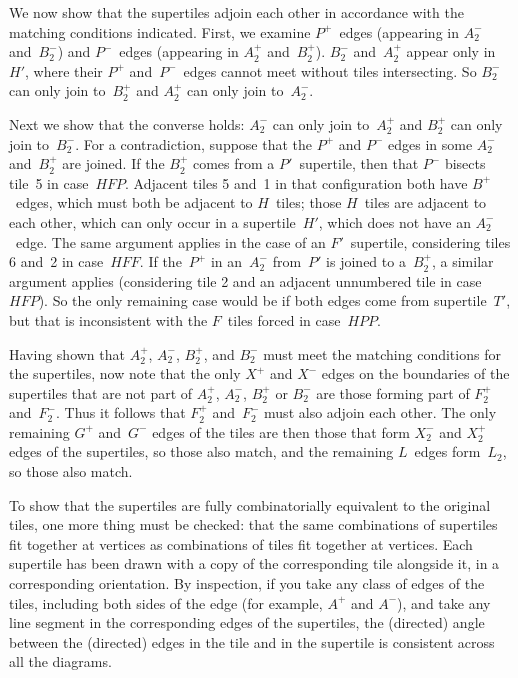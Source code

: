 We now show that the supertiles adjoin each other in accordance with
the matching conditions indicated.  First, we examine $P^+$~edges
(appearing in $A^-_2$ and~$B^-_2$) and $P^-$~edges (appearing in
$A^+_2$ and~$B^+_2$).  $B^-_2$ and~$A^+_2$ appear only in~$H'$, where
their $P^+$ and~$P^-$~edges cannot meet without tiles intersecting.
So $B^-_2$ can only join to~$B^+_2$ and $A^+_2$ can only join to~$A^-_2$.

Next we show that the converse holds: $A^-_2$ can only join to~$A^+_2$
and $B^+_2$ can only join to~$B^-_2$.  For a contradiction, suppose
that the $P^+$ and $P^-$ edges in some $A^-_2$ and~$B^+_2$ are joined.
If the $B^+_2$ comes from a $P'$~supertile, then that $P^-$ bisects
tile~5 in case~$HFP$.  Adjacent tiles 5 and~1 in that configuration
both have $B^+$~edges, which must both be adjacent to $H$~tiles; those
$H$~tiles are adjacent to each other, which can only occur in a
supertile~$H'$, which does not have an $A^-_2$~edge.  The same
argument applies in the case of an $F'$~supertile, considering tiles 6
and~2 in case~$HFF$.  If the~$P^+$ in an~$A^-_2$ from~$P'$ is joined
to a~$B^+_2$, a similar argument applies (considering tile 2 and an
adjacent unnumbered tile in case~$HFP$).  So the only remaining case
would be if both edges come from supertile~$T'$, but that is
inconsistent with the $F$~tiles forced in case~$HPP$.

Having shown that $A^+_2$, $A^-_2$, $B^+_2$, and $B^-_2$ must meet the
matching conditions for the supertiles, now note that the only $X^+$
and $X^-$ edges on the boundaries of the supertiles that are not part
of $A^+_2$, $A^-_2$, $B^+_2$ or $B^-_2$ are those forming part of
$F^+_2$ and~$F^-_2$.  Thus it follows that $F^+_2$ and~$F^-_2$ must
also adjoin each other.  The only remaining $G^+$ and~$G^-$ edges of
the tiles are then those that form $X^-_2$ and $X^+_2$ edges of the
supertiles, so those also match, and the remaining $L$~edges
form~$L_2$, so those also match.

To show that the supertiles are fully combinatorially equivalent to
the original tiles, one more thing must be checked: that the same
combinations of supertiles fit together at vertices as combinations of
tiles fit together at vertices.  Each supertile has been drawn with a
copy of the corresponding tile alongside it, in a corresponding
orientation.  By inspection, if you take any class of edges of the
tiles, including both sides of the edge (for example, $A^+$ and
$A^-$), and take any line segment in the corresponding edges of the
supertiles, the (directed) angle between the (directed) edges in the
tile and in the supertile is consistent across all the diagrams.

